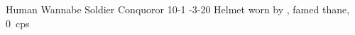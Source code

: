 \filledCS%
  {\currentName}%
  {Human}%
  {Wannabe Soldier}%
  {Conquoror}%
  {{1}{0}{-1}}%
  {{-3}{-2}{0}}%
  {%
    \renewcommand\rank{Fodder}
    \renewcommand\characterDebt{100 \glspl{sp}}
    \setcounter{Athletics}{1}
    \setcounter{Cultivation}{1}
    \setcounter{Deceit}{1}
    \setcounter{Performance}{1}
    \setcounter{Melee}{1}
    \setcounter{Brawl}{1}
    \setcounter{Projectiles}{1}
    \longsword
    \partialleather
  }%
  {}%
  {Helmet worn by \composeHumanName, famed  \gls{thane}, 0~\glspl{cp}}%

